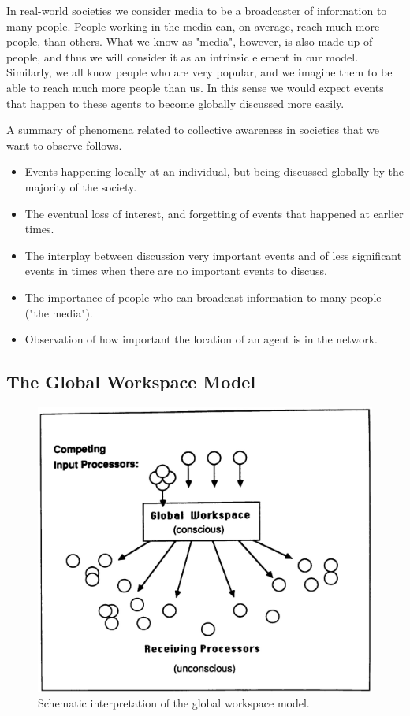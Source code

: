 \documentclass [12pt,a4paper,twoside]{article}
\begin{document}
In real-world societies we consider media to be a broadcaster of information to many people. People working in the media can, on average, reach much more people, than others. What we know as "media", however, is also made up of people, and thus we will consider it as an intrinsic element in our model. Similarly, we all know people who are very popular, and we imagine them to be able to reach much more people than us. In this sense we would expect events that happen to these agents to become globally discussed more easily.

A summary of phenomena related to collective awareness in societies that we want to observe follows.
\begin{itemize}
\item Events happening locally at an individual, but being discussed globally by the majority of the society.
\item The eventual loss of interest, and forgetting of events that happened at earlier times.
\item The interplay between discussion very important events and of less significant events in times when there are no important events to discuss.
\item The importance of people who can broadcast information to many people ("the media").
\item Observation of how important the location of an agent is in the network.
\end{itemize}

\subsection{The Global Workspace Model}

\begin{figure}[H]
  \centering
  \includegraphics[width=0.49\linewidth]{report/GW_schematic.jpg}
  \caption{Schematic interpretation of the global workspace model.}
  \label{global_workspace}
\end{figure}
\end{document}
